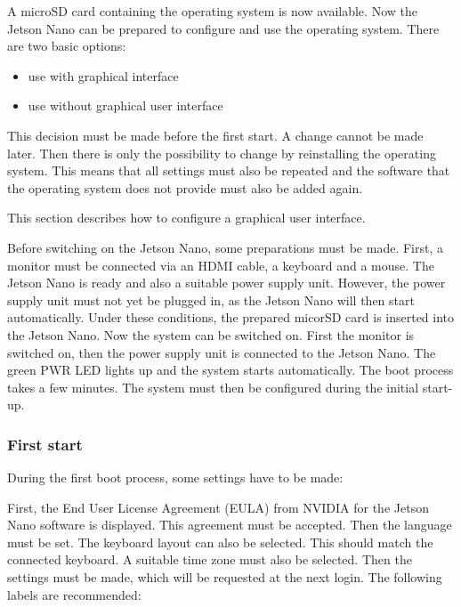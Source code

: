 A microSD card containing the operating system is now available. Now the Jetson Nano can be prepared to configure and use the operating system. There are two basic options:

\begin{itemize}
    \item use with graphical interface
    \item use without graphical user interface
\end{itemize}

This decision must be made before the first start. A change cannot be made later. Then there is only the possibility to change by reinstalling the operating system. This means that all settings must also be repeated and the software that the operating system does not provide must also be added again.

\bigskip

This section describes how to configure a graphical user interface.

\bigskip

Before switching on the Jetson Nano, some preparations must be made. First, a monitor must be connected via an HDMI cable, a keyboard and a mouse. The Jetson Nano is ready and also a suitable power supply unit. However, the power supply unit must not yet be plugged in, as the Jetson Nano will then start automatically. Under these conditions, the prepared micorSD card is inserted into the Jetson Nano. Now the system can be switched on. First the monitor is switched on, then the power supply unit is connected to the Jetson Nano. The green PWR LED lights up and the system starts automatically. The boot process takes a few minutes. The system must then be configured during the initial start-up.


\subsubsection{First start}

During the first boot process, some settings have to be made:


\bigskip

First, the End User License Agreement (EULA) from NVIDIA for the Jetson Nano software is displayed. This agreement must be accepted. Then the language must be set. The keyboard layout can also be selected. This should match the connected keyboard. A suitable time zone must also be selected. Then the settings must be made, which will be requested at the next login. The following labels are recommended:


